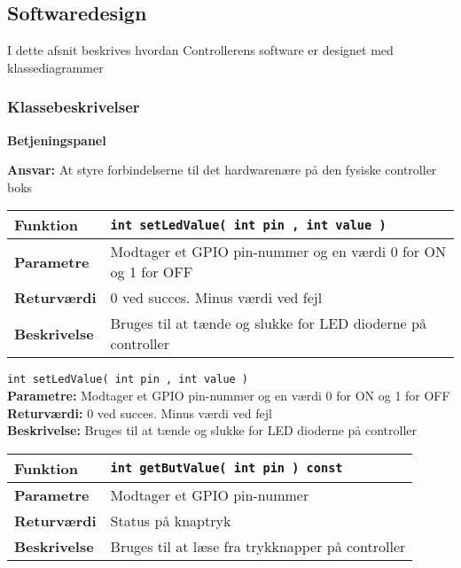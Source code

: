 \subsection{Softwaredesign}

I dette afsnit beskrives hvordan Controllerens software er designet med klassediagrammer

\subsubsection*{Klassebeskrivelser}


{\centering
\textbf{Betjeningspanel}\par
}
\textbf{Ansvar:} At styre forbindelserne til det hardwarenære på den fysiske controller boks \

\begin{center}
    \begin{tabular}{ | l | p{10cm} |}
    \hline
    \textbf{Funktion}	& \verb+int setLedValue( int pin , int value ) +						\\ \hline
    \textbf{Parametre} 	& Modtager et GPIO pin-nummer og en værdi 0 for ON og 1 for OFF		\\ \hline
    \textbf{Returværdi}	& 0 ved succes. Minus værdi ved fejl 								\\ \hline
    \textbf{Beskrivelse}	& Bruges til at tænde og slukke for LED dioderne på controller		\\ \hline
    \end{tabular}
\end{center}


\verb+int setLedValue( int pin , int value ) +\\
\textbf{Parametre:}   Modtager et GPIO pin-nummer og en værdi 0 for ON og 1 for OFF \\
\textbf{Returværdi:}  0 ved succes. Minus værdi ved fejl \\
\textbf{Beskrivelse:} Bruges til at tænde og slukke for LED dioderne på controller \\

\begin{center}
    \begin{tabular}{ | l | p{10cm} |}
    \hline
    \textbf{Funktion}	& \verb+int getButValue( int pin ) const +						\\ \hline
    \textbf{Parametre} 	& Modtager et GPIO pin-nummer									\\ \hline
    \textbf{Returværdi}	& Status på knaptryk 											\\ \hline
    \textbf{Beskrivelse}	& Bruges til at læse fra trykknapper på controller				\\ \hline
    \end{tabular}
\end{center}

